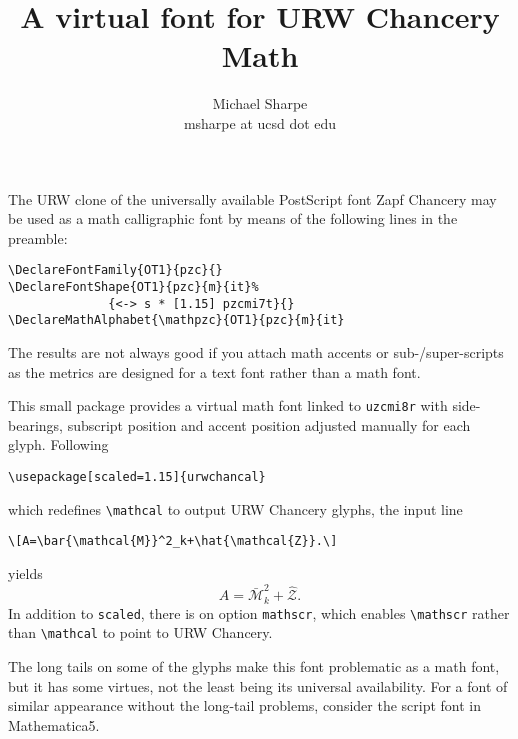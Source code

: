 \documentclass[11pt]{article}
\title{A virtual font for URW Chancery Math}
\author{Michael Sharpe\\msharpe at ucsd dot edu}
\begin{document}
\maketitle
The URW clone of the universally available PostScript font Zapf Chancery may be used as a math calligraphic font by means of the following lines in the preamble:
\begin{verbatim}
\DeclareFontFamily{OT1}{pzc}{}
\DeclareFontShape{OT1}{pzc}{m}{it}%
              {<-> s * [1.15] pzcmi7t}{}
\DeclareMathAlphabet{\mathpzc}{OT1}{pzc}{m}{it}
\end{verbatim}

The results are not always good if you attach math accents or sub-/super-scripts as the metrics are designed for a text font rather than a math font.

This small package provides a virtual math font linked to \verb|uzcmi8r| with side-bearings, subscript position and accent position adjusted manually for each glyph. 
Following 
\begin{verbatim}
\usepackage[scaled=1.15]{urwchancal}
\end{verbatim}
 which redefines \verb|\mathcal| to output URW Chancery glyphs, the input line 
\begin{verbatim}
\[A=\bar{\mathcal{M}}^2_k+\hat{\mathcal{Z}}.\]
\end{verbatim}
yields
\[A=\bar{\mathcal{M}}^2_k+\hat{\mathcal{Z}}.\]
In addition to \verb|scaled|, there is on option \verb|mathscr|, which enables \verb|\mathscr| rather than \verb|\mathcal| to point to URW Chancery.

The long tails on some of the glyphs make this font problematic as a math font, but it has some virtues, not the least being its universal availability. For a font of similar appearance without the long-tail problems, consider the script font in Mathematica5.
\end{document}
